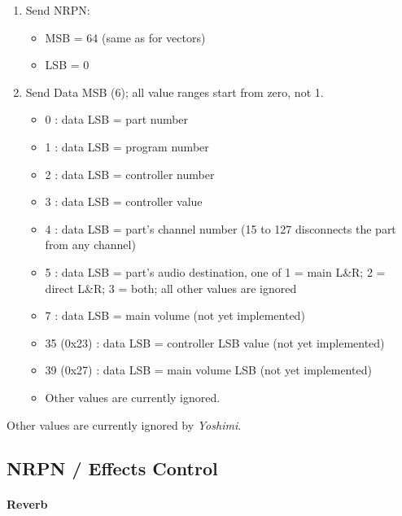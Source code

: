    \begin{enumerate}
      \item Send NRPN: 
      \begin{itemize}
         \item MSB = 64 (same as for vectors)
         \item LSB = 0
      \end{itemize}
      \item Send Data MSB (6); all value ranges start from zero, not 1.
      \begin{itemize}
         \item 0 : data LSB = part number
         \item 1 : data LSB = program number
         \item 2 : data LSB = controller number
         \item 3 : data LSB = controller value
         \item 4 : data LSB = part's channel number (15 to 127 disconnects
            the part from any channel)
         \item 5 : data LSB = part's audio destination, one of
                    1 = main L\&R;
                    2 = direct L\&R;
                    3 = both;
                    all other values are ignored
         \item 7 : data LSB = main volume (not yet implemented)
         \item 35 (0x23) : data LSB = controller LSB value (not yet implemented)
         \item 39 (0x27) : data LSB = main volume LSB (not yet implemented)
         \item Other values are currently ignored.
      \end{itemize}
   \end{enumerate}

   Other values are currently ignored by \textsl{Yoshimi}.

\subsection{NRPN / Effects Control}
\label{subsection:nrpns_midi_nrpn_effects_control}

\paragraph{Reverb}

